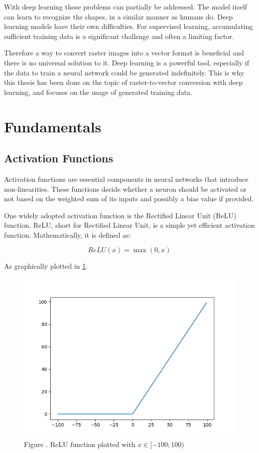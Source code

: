\documentclass[12pt, a4paper, titlepage]{report}
\begin{document}
With deep learning those problems can partially be addressed. The model itself can learn to recognize the shapes, in a similar manner as humans do. Deep learning models have their own difficulties. For supervised learning, accumulating sufficient training data is a significant challenge and often a limiting factor.

Therefore a way to convert raster images into a vector format is beneficial and there is no universal solution to it. Deep learning is a powerful tool, especially if the data to train a neural network could be generated indefinitely.
This is why this thesis has been done on the topic of raster-to-vector conversion with deep learning, and focuses on the usage of generated training data.



\section{Fundamentals}

\subsection{Activation Functions}


Activation functions are essential components in neural networks that introduce non-linearities. These functions decide whether a neuron should be activated or not based on the weighted sum of its inputs and possibly a bias value if provided.

One widely adopted activation function is the Rectified Linear Unit (ReLU) function.
ReLU, short for Rectified Linear Unit, is a simple yet efficient activation function. Mathematically, it is defined as:

\[ ReLU(x) = \max(0, x) \]

As graphically plotted in \ref{fig:relu_function}.

\begin{figure}[h]
	\centering
	\includegraphics[width=1.0\textwidth]{../rc/images/graph_relu_function.png}
\caption{Figure \cite{graph_relu_function}. ReLU function plotted with $x \in {[-100; 100)}$}
	\label{fig:relu_function}
\end{figure}
\end{document}
